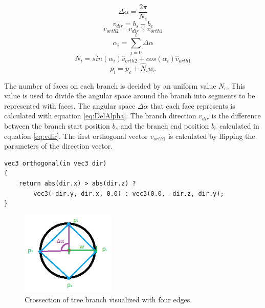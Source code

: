 \documentclass[11pt]{article} %
\begin{document}
\begin{equation}
	\label{eq:DelAlpha}
	\Delta \alpha = \frac{2 \pi}{N_{e}}
\end{equation}
\begin{equation}
	\label{eq:vdir}
	v_{dir} = b_{s} - b_{e} 
\end{equation}
\begin{equation}
	\label{eq:vcross}
	v_{orth2} = v_{dir}\times v_{orth1}
\end{equation}
\begin{equation}
	\label{eq:alphai}
	\alpha_{i} = \sum_{j = 0}^{i}\Delta \alpha
\end{equation}
\begin{equation}
	\label{eq:betai}
	N_{i} = sin(\alpha_{i}) \hat{v}_{orth2} + cos(\alpha_{i}) \hat{v}_{orth1}
\end{equation}
\begin{equation}
	\label{eq:pi}
	p_{i}=p_{c} +  \hat{N}_{i} w_{c}
\end{equation}

The number of faces on each branch is decided by an uniform value $N_{e}$.
This value is used to divide the angular space around the branch into segments to be represented with faces.
The angular space $ \Delta \alpha $ that each face represents is calculated with equation \ref{eq:DelAlpha}.
The branch direction $ v_{dir} $ is the difference between the branch start position $ b_{s} $
and the branch end position $ b_{e} $ calculated in equation \ref{eq:vdir}.
The first orthogonal vector $ v_{orth1} $ is calculated by flipping the parameters of the direction vector.

\begin{lstlisting}
vec3 orthogonal(in vec3 dir)
{
	return abs(dir.x) > abs(dir.z) ? 
		vec3(-dir.y, dir.x, 0.0) : vec3(0.0, -dir.z, dir.y);
}
\end{lstlisting}

\begin{figure}[htp]
	\centering
	\includegraphics[width=0.4\textwidth]{branchAngles.png}
	\caption{Crossection of tree branch visualized with four edges.}
	\label{fig:branchAngles}
\end{figure}
\end{document}
